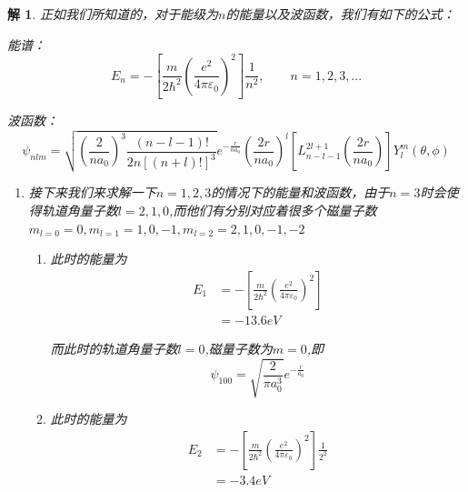 \documentclass{article}
\newtheorem{solution}{解}
\begin{document}
\begin{solution}
    正如我们所知道的，对于能级为$n$的能量以及波函数，我们有如下的公式：
    
    能谱：
    \begin{equation*}
        E_n=-\left[\frac{m}{2\hbar^2}\left(\frac{e^2}{4\pi\varepsilon_0}\right)^2\right]\frac{1}{n^2},\quad\quad n=1,2,3,...
    \end{equation*}
    
    波函数：
    \begin{equation*}
        \psi_{nlm}=\sqrt{\left(\frac{2}{na_0}\right)^3\frac{(n-l-1)!}{2n[(n+l)!]^3}}e^{-\frac{r}{na_0}}\left(\frac{2r}{na_0}\right)^l[L^{2l+1}_{n-l-1}\left(\frac{2r}{na_0}\right)]Y^{m}_{l}(\theta,\phi)
    \end{equation*}
    \begin{enumerate}
        \item 接下来我们来求解一下$n=1,2,3$的情况下的能量和波函数，由于$n=3$时会使得轨道角量子数$l=2,1,0$,而他们有分别对应着很多个磁量子数$m_{l=0}=0,m_{l=1}=1,0,-1,m_{l=2}=2,1,0,-1,-2$
        \begin{enumerate}
            \item[n=1时] 此时的能量为
            \begin{align*}
                E_1&=-\left[\frac{m}{2\hbar^2}\left(\frac{e^2}{4\pi\varepsilon_0}\right)^2\right]\\
                &=-13.6 eV
            \end{align*}

            而此时的轨道角量子数$l=0$,磁量子数为$m=0$,即
            \[ 
                \psi_{100} = \sqrt{\frac{2}{\pi a_0^3}} e^{-\frac{r}{a_0}} 
            \]
            \item[n=2时] 此时的能量为
            \begin{align*}
                E_2&=-\left[\frac{m}{2\hbar^2}\left(\frac{e^2}{4\pi\varepsilon_0}\right)^2\right]\frac{1}{2^2}\\
                &=-3.4 eV
            \end{align*}


\end{enumerate}
\end{enumerate}
\end{solution}
\end{document}
